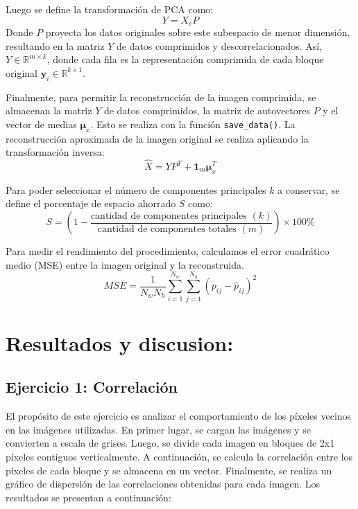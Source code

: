 \documentclass[a4paper,12pt]{article}
\begin{document}
Luego se define la transformación de PCA como:
\begin{equation}
Y = X_c P
\label{eq:pca}
\end{equation}
Donde $P$ proyecta los datos originales sobre este subespacio de menor dimensión, resultando en la matriz $Y$ de datos comprimidos y descorrelacionados. Así, $Y \in \mathbb{R}^{m \times k}$, donde cada fila es la representación comprimida de cada bloque original $\mathbf{y}_i \in \mathbb{R}^{k \times 1}$.

Finalmente, para permitir la reconstrucción de la imagen comprimida, se almacenan la matriz $Y$ de datos comprimidos, la matriz de autovectores $P$ y el vector de medias $\boldsymbol{\mu}_x$. Esto se realiza con la función \texttt{save\_data()}. La reconstrucción aproximada de la imagen original se realiza aplicando la transformación inversa:
\begin{equation}
\hat{X} = Y P^T + \mathbf{1}_m \boldsymbol{\mu}_x^T
\label{eq:reconstruccion}
\end{equation}

Para poder seleccionar el número de componentes principales $k$ a conservar, se define el porcentaje de espacio ahorrado $S$ como:
\begin{equation}
S = \left( 1 - \frac{\text{cantidad de componentes principales } (k)}{\text{cantidad de componentes totales } (m)} \right) \times 100 \%
\label{eq:espacio}
\end{equation}

Para medir el rendimiento del procedimiento, calculamos el error cuadrático medio (MSE) entre la imagen original y la reconstruida. 
\begin{equation}
MSE = \frac{1}{N_w N_h} \sum_{i=1}^{N_w} \sum_{j=1}^{N_h} (p_{ij} - \hat{p}_{ij})^2
\label{eq:mse}
\end{equation}

\newpage

\section{Resultados y discusion:}
\subsection*{Ejercicio 1: Correlación}
El propósito de este ejercicio es analizar el comportamiento de los píxeles vecinos en las imágenes utilizadas. En primer lugar, se cargan las imágenes y se convierten a escala de grises. Luego, se divide cada imagen en bloques de 2x1 píxeles contiguos verticalmente. A continuación, se calcula la correlación entre los píxeles de cada bloque y se almacena en un vector. Finalmente, se realiza un gráfico de dispersión de las correlaciones obtenidas para cada imagen. Los resultados se presentan a continuación:
\end{document}
